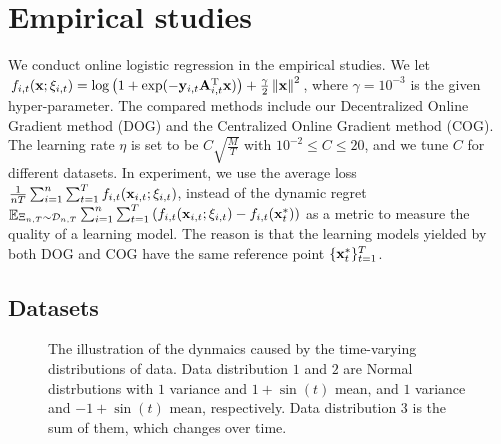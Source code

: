 \documentclass{article}
\begin{document}
\section{Empirical studies}


We conduct online logistic regression in the empirical studies. We let $f_{i,t}({\bf x};\xi_{i,t}) = \log\left( 1+\exp(-{\bf y}_{i,t}{\bf A}_{i,t}^{\rm T} {\bf x}) \right) + \frac{\gamma}{2}\left\lVert{\bf x}\right\rVert^2$, where $\gamma = 10^{-3}$ is the given hyper-parameter. The compared methods include our Decentralized Online Gradient method (DOG) and the Centralized Online Gradient method (COG). The learning rate $\eta$ is set to be $C\sqrt{\frac{M}{T}}$ with  $10^{-2} \le C \le 20$, and we tune $C$ for different datasets. In experiment, we use the average loss $\frac{1}{nT}\sum_{i=1}^n\sum_{t=1}^T f_{i,t}({\bf x}_{i,t};\xi_{i,t})$, instead of the dynamic regret $\mathop{\mathbb{E}}_{\Xi_{n,T}\sim \mathcal{D}_{n,T}}\sum_{i=1}^n\sum_{t=1}^T \left(  f_{i,t}({\bf x}_{i,t};\xi_{i,t}) - f_{i,t}({\bf x}_t^{\ast})  \right)$ as a metric to measure the quality of a learning model. The reason is that the   learning models yielded by both DOG and COG have the same reference point $\{{\bf x}_t^\ast\}^T_{t=1}$.  

\subsection{Datasets}

\begin{figure}[!]
\setlength{\abovecaptionskip}{0pt}
\setlength{\belowcaptionskip}{0pt}
\centering 
{}
\caption{The illustration of the dynmaics caused by the time-varying distributions of data. Data distribution $1$ and $2$ are  Normal distrbutions with $1$ variance and $1+\sin(t)$ mean, and $1$ variance and $-1+\sin(t)$ mean, respectively. Data distribution $3$ is the sum of them, which changes over time. }
\label{figure_illus_dynamics}
\end{figure}
\end{document}
